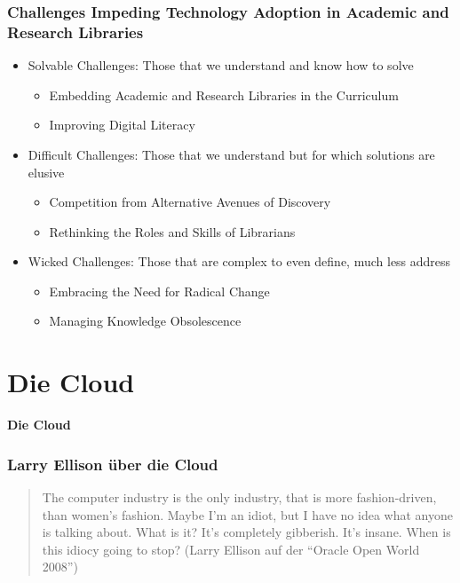   \begin{frame}
    \frametitle{Challenges Impeding Technology Adoption in Academic and Research Libraries}

    \pause

      \begin{itemize}
        \item Solvable Challenges: Those that we understand and know how to solve
          \begin{itemize}
            \item Embedding Academic and Research Libraries in the Curriculum
            \item Improving Digital Literacy
          \end{itemize}
        \item Difficult Challenges: Those that we understand but for which solutions are elusive
          \begin{itemize}
            \item Competition from Alternative Avenues of Discovery
            \item Rethinking the Roles and Skills of Librarians
          \end{itemize}
        \item Wicked Challenges: Those that are complex to even define, much less address
          \begin{itemize}
            \item Embracing the Need for Radical Change
            \item Managing Knowledge Obsolescence
          \end{itemize}
      \end{itemize}
  \end{frame}

\section{Die Cloud}
\begin{frame}[c]
\begin{center}
  \textbf{Die Cloud}
\end{center}
\end{frame}

\begin{frame}[c]\frametitle<beamer>{Larry Ellison über die Cloud}
    \begin{quote}
      The computer industry is the only industry, that is more fashion-driven, than women's fashion. Maybe I'm an idiot, but I have no idea what anyone is talking about. What is it? It's completely gibberish. It's insane. When is this idiocy going to stop? 
      \hfill (Larry Ellison auf der ``Oracle Open World 2008'')
    \end{quote}
\end{frame}

